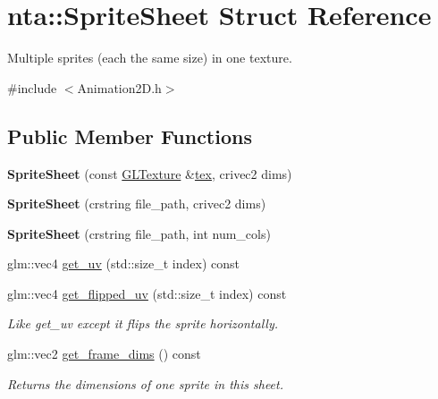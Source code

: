 \hypertarget{structnta_1_1SpriteSheet}{}\section{nta\+:\+:Sprite\+Sheet Struct Reference}
\label{structnta_1_1SpriteSheet}


Multiple sprites (each the same size) in one texture.  




{\ttfamily \#include $<$Animation2\+D.\+h$>$}

\subsection*{Public Member Functions}
\begin{DoxyCompactItemize}
\item 
\mbox{\label{structnta_1_1SpriteSheet_acb0a6cab5e60d26a8e00d1e78974456b}} 
{\bfseries Sprite\+Sheet} (const \hyperlink{structnta_1_1GLTexture}{G\+L\+Texture} \&\hyperlink{structnta_1_1SpriteSheet_a6c55217abab2dbd76b61ad92fe902367}{tex}, crivec2 dims)
\item 
\mbox{\label{structnta_1_1SpriteSheet_aca9119d89a8c2c9e8e88cc43844c264a}} 
{\bfseries Sprite\+Sheet} (crstring file\+\_\+path, crivec2 dims)
\item 
\mbox{\label{structnta_1_1SpriteSheet_a68232c976caa805754f7b3863129ee09}} 
{\bfseries Sprite\+Sheet} (crstring file\+\_\+path, int num\+\_\+cols)
\item 
glm\+::vec4 \hyperlink{structnta_1_1SpriteSheet_a618bc48e6978a19ad9eb56dda3307f5a}{get\+\_\+uv} (std\+::size\+\_\+t index) const
\item 
\mbox{\label{structnta_1_1SpriteSheet_a98643a92390617ac5575b7a951e9805a}} 
glm\+::vec4 \hyperlink{structnta_1_1SpriteSheet_a98643a92390617ac5575b7a951e9805a}{get\+\_\+flipped\+\_\+uv} (std\+::size\+\_\+t index) const
\begin{DoxyCompactList}\small\item\em Like get\+\_\+uv except it flips the sprite horizontally. \end{DoxyCompactList}\item 
\mbox{\label{structnta_1_1SpriteSheet_aa29557bfccf62bef73a11e7f38439fb8}} 
glm\+::vec2 \hyperlink{structnta_1_1SpriteSheet_aa29557bfccf62bef73a11e7f38439fb8}{get\+\_\+frame\+\_\+dims} () const
\begin{DoxyCompactList}\small\item\em Returns the dimensions of one sprite in this sheet. \end{DoxyCompactList}\end{DoxyCompactItemize}
